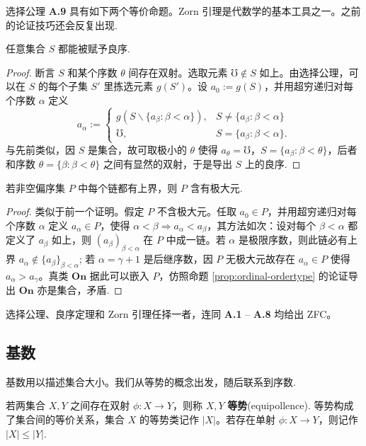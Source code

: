选择公理 \textbf{A.9} 具有如下两个等价命题。Zorn 引理是代数学的基本工具之一。之前的论证技巧还会反复出现.
\begin{theorem}\label{prop:wellorder-principle}
	任意集合 $S$ 都能被赋予良序.
\end{theorem}
\begin{proof}
	断言 $S$ 和某个序数 $\theta$ 间存在双射。选取元素 $\mho \notin S$ 如上。由选择公理，可以在 $S$ 的每个子集 $S'$ 里拣选元素 $g(S')$。设 $a_0 := g(S)$，并用超穷递归对每个序数 $\alpha$ 定义
	\[ a_\alpha := \begin{cases}
		g \left( S \backslash \{ a_\beta : \beta < \alpha \} \right), & S \neq \{ a_\beta : \beta < \alpha \} \\
		\mho, & S = \{ a_\beta : \beta < \alpha \}.
	\end{cases}\]
	与先前类似，因 $S$ 是集合，故可取极小的 $\theta$ 使得 $a_\theta = \mho$，$S = \{a_\beta: \beta < \theta\}$，后者和序数 $\theta = \{\beta : \beta < \theta \}$ 之间有显然的双射，于是导出 $S$ 上的良序.
\end{proof}

\begin{theorem}[Zorn 引理]
	若非空偏序集 $P$ 中每个链都有上界，则 $P$ 含有极大元.
\end{theorem}
\begin{proof}
	类似于前一个证明。假定 $P$ 不含极大元。任取 $a_0 \in P$，并用超穷递归对每个序数 $\alpha$ 定义 $a_\alpha \in P$，使得 $\alpha < \beta \Rightarrow a_\alpha < a_\beta$，其方法如次：设对每个 $\beta < \alpha$ 都定义了 $a_\beta$ 如上，则 $(a_\beta)_{\beta < \alpha}$ 在 $P$ 中成一链。若 $\alpha$ 是极限序数，则此链必有上界 $a_\alpha \notin \{ a_\beta \}_{\beta < \alpha}$; 若 $\alpha = \gamma + 1$ 是后继序数，因 $P$ 无极大元故存在 $a_\alpha \in P$ 使得 $a_\alpha > a_\gamma$。真类 $\mathbf{On}$ 据此可以嵌入 $P$，仿照命题 \ref{prop:ordinal-ordertype} 的论证导出 $\mathbf{On}$ 亦是集合，矛盾.
\end{proof}
选择公理、良序定理和 Zorn 引理任择一者，连同 \textbf{A.1} -- \textbf{A.8} 均给出 ZFC。

\subsection{基数}
基数用以描述集合大小。我们从等势的概念出发，随后联系到序数.

\begin{definition}
	若两集合 $X, Y$ 之间存在双射 $\phi: X \to Y$，则称 $X, Y$ \textbf{等势}(equipollence).
	等势构成了集合间的等价关系，集合 $X$ 的等势类记作 $|X|$。若存在单射 $\phi: X \to Y$，则记作 $|X| \leqslant |Y|$.
\end{definition}

